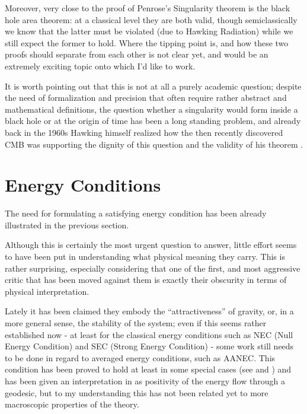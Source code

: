 \documentclass[12pt, a4paper]{article}
\begin{document}
Moreover, very close to the proof of Penrose's Singularity theorem is the black hole area theorem: at a classical level they are both valid, though semiclassically we know that the latter must be violated (due to Hawking Radiation) while we still expect the former to hold. Where the tipping point is, and how these two proofs should separate from each other is not clear yet, and would be an extremely exciting topic onto which I'd like to work.

It is worth pointing out that this is not at all a purely academic question; despite the need of formalization and precision that often require rather abstract and mathematical definitions, the question whether a singularity would form inside a black hole or at the origin of time has been a long standing problem, and already back in the 1960s Hawking himself realized how the then  recently discovered CMB was supporting the dignity of this question and the validity of his theorem \cite{hawking1968cosmic}.

\clearpage

\section{Energy Conditions}

The need for formulating a satisfying energy condition has been already illustrated in the previous section.

Although this is certainly the most urgent question to answer, little effort seems to have been put in understanding what physical meaning they carry. This is rather surprising, especially considering that one of the first, and most aggressive critic that has been moved against them is exactly their obscurity in terms of physical interpretation.

Lately it has been claimed they embody the ``attractiveness''  of gravity, or, in a more general sense, the stability of the system; even if this seems rather established now - at least for the classical energy conditions such as NEC (Null Energy Condition) and SEC (Strong Energy Condition) - some work still needs to be done in regard to averaged energy conditions, such as AANEC. 
This condition has been proved to hold at least in some special cases (see \cite{wall2010proving} and \cite{verch2000averaged}) and has been given an interpretation in \cite{curiel2017primer} as positivity of the energy flow through a geodesic, but to my understanding this has not been related yet to more macroscopic properties of the theory.
\end{document}
